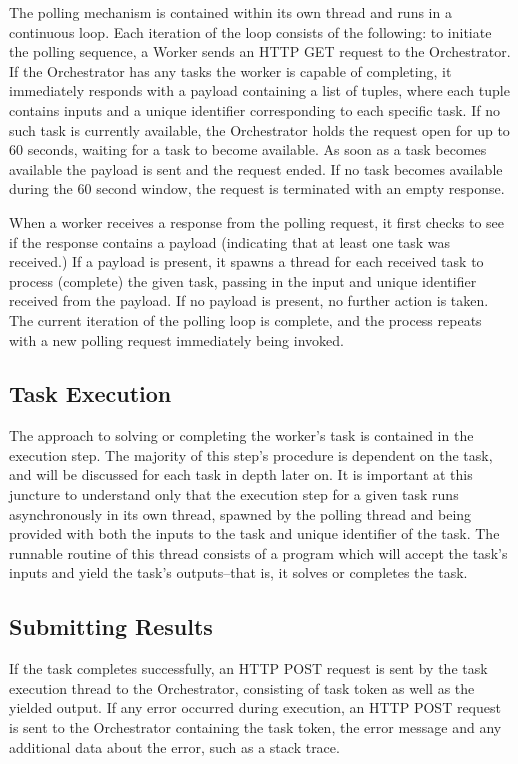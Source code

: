 The polling mechanism is contained within its own thread and runs in a continuous loop. Each iteration of the loop consists of the following: to initiate the polling sequence, a Worker sends an HTTP GET request to the Orchestrator. If the Orchestrator has any tasks the worker is capable of completing, it immediately responds with a payload containing a list of tuples, where each tuple contains inputs and a unique identifier corresponding to each specific task. If no such task is currently available, the Orchestrator holds the request open for up to 60 seconds, waiting for a task to become available. As soon as a task becomes available the payload is sent and the request ended. If no task becomes available during the 60 second window, the request is terminated with an empty response.

When a worker receives a response from the polling request, it first checks to see if the response contains a payload (indicating that at least one task was received.) If a payload is present, it spawns a thread for each received task to process (complete) the given task, passing in the input and unique identifier received from the payload. If no payload is present, no further action is taken. The current iteration of the polling loop is complete, and the process repeats with a new polling request immediately being invoked.

\subsection{Task Execution}

The approach to solving or completing the worker’s task is contained in the execution step. The majority of this step’s procedure is dependent on the task, and will be discussed for each task in depth later on. It is important at this juncture to understand only that the execution step for a given task runs asynchronously in its own thread, spawned by the polling thread and being provided with both the inputs to the task and unique identifier of the task. The runnable routine of this thread consists of a program which will accept the task’s inputs and yield the task’s outputs--that is, it solves or completes the task. 

\subsection{Submitting Results}

If the task completes successfully, an HTTP POST request is sent by the task execution thread to the Orchestrator, consisting of task token as well as the yielded output. If any error occurred during execution, an HTTP POST request is sent to the Orchestrator containing the task token, the error message and any additional data about the error, such as a stack trace.

